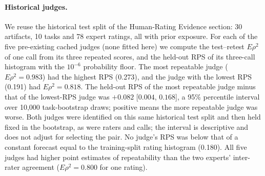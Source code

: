 \paragraph{Historical judges.}
We reuse the historical test split of the Human-Rating Evidence section: 30 artifacts, 10 tasks and 78 expert ratings, all with prior exposure.
For each of the five pre-existing cached judges (none fitted here) we compute the test--retest $E\rho^2$ of one call from its three repeated scores, and the held-out RPS of its three-call histogram with the $10^{-6}$ probability floor.
The most repeatable judge ($E\rho^2=0.983$) had the highest RPS (0.273), and the judge with the lowest RPS (0.191) had $E\rho^2=0.818$.
The held-out RPS of the most repeatable judge minus that of the lowest-RPS judge was $+0.082$ [$0.004$, $0.168$], a 95\% percentile interval over 10,000 task-bootstrap draws; positive means the more repeatable judge was worse.
Both judges were identified on this same historical test split and then held fixed in the bootstrap, as were raters and calls; the interval is descriptive and does not adjust for selecting the pair.
No judge's RPS was below that of a constant forecast equal to the training-split rating histogram (0.180).
All five judges had higher point estimates of repeatability than the two experts' inter-rater agreement ($E\rho^2=0.800$ for one rating).

